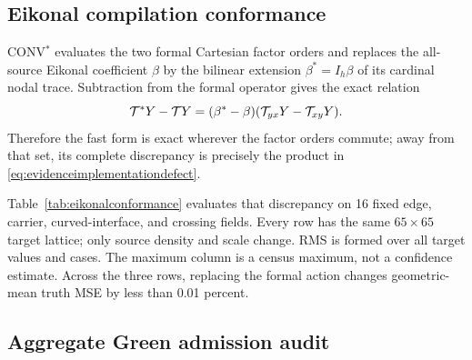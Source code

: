 \subsection{Eikonal compilation conformance}

CONV$^{*}$ evaluates the two formal Cartesian factor orders and replaces the
all-source Eikonal coefficient \(\beta\) by the bilinear extension
\(\beta^*=I_h\beta\) of its cardinal nodal trace. Subtraction from the formal
operator gives the exact relation
\begin{equation}
 \mathcal{T}^*Y-\mathcal{T} Y
 = (\beta^*-\beta)(\mathcal{T}_{yx}Y-\mathcal{T}_{xy}Y).
 \label{eq:evidenceimplementationdefect}
\end{equation}
Therefore the fast form is exact wherever the factor orders commute; away
from that set, its complete discrepancy is precisely the product in
\eqref{eq:evidenceimplementationdefect}.

Table~\ref{tab:eikonalconformance} evaluates that discrepancy on 16 fixed
edge, carrier, curved-interface, and crossing fields. Every row has the same
$65\times65$ target lattice; only source density and scale change. RMS is
formed over all target values and cases. The maximum column is a census
maximum, not a confidence estimate. Across the three rows, replacing the
formal action changes geometric-mean truth MSE by less than 0.01 percent.

\begin{table}[H]
\caption{CONV$^{*}$ conformance to formal Eikonal CONV at target side 65}
\label{tab:eikonalconformance}
\centering
\scriptsize
\setlength{\tabcolsep}{2.5pt}
\end{table}

\subsection{Aggregate Green admission audit}

